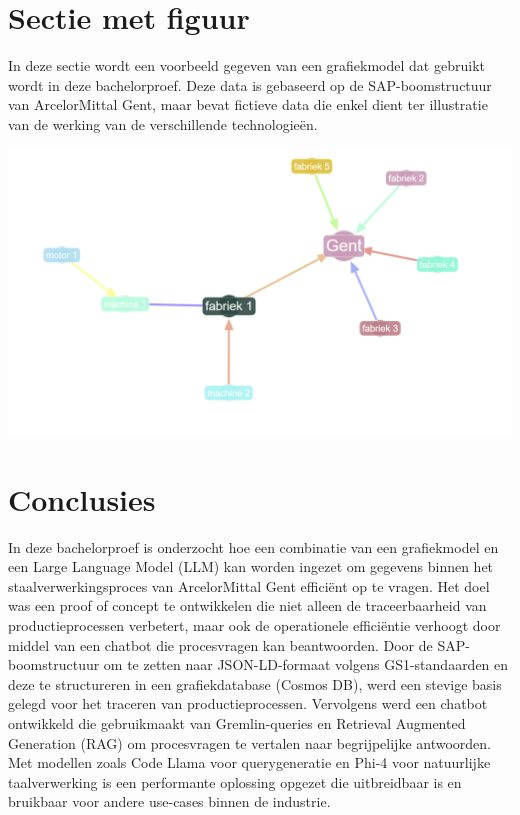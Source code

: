 \documentclass[a0,portrait]{hogent-poster}
\begin{document}
\begin{multicols}{2}
\section{Sectie met figuur}
In deze sectie wordt een voorbeeld gegeven van een grafiekmodel dat gebruikt wordt in deze bachelorproef.
Deze data is gebaseerd op de SAP-boomstructuur van ArcelorMittal Gent, maar bevat fictieve data die enkel dient ter illustratie van de werking van de verschillende technologieën.

\begin{center}
  \captionsetup{type=figure}
  \includegraphics[width=1.0\linewidth]{./img/grapmodel_example.png}
\end{center}

\section{Conclusies}
In deze bachelorproef is onderzocht hoe een combinatie van een grafiekmodel en een Large Language Model (LLM) kan worden ingezet om gegevens binnen het staalverwerkingsproces van ArcelorMittal Gent efficiënt op te vragen.
Het doel was een proof of concept te ontwikkelen die niet alleen de traceerbaarheid van productieprocessen verbetert, maar ook de operationele efficiëntie verhoogt door middel van een chatbot die procesvragen kan beantwoorden.
Door de SAP-boomstructuur om te zetten naar JSON-LD-formaat volgens GS1-standaarden en deze te structureren in een grafiekdatabase (Cosmos DB), werd een stevige basis gelegd voor het traceren van productieprocessen.
Vervolgens werd een chatbot ontwikkeld die gebruikmaakt van Gremlin-queries en Retrieval Augmented Generation (RAG) om procesvragen te vertalen naar begrijpelijke antwoorden.
Met modellen zoals Code Llama voor querygeneratie en Phi-4 voor natuurlijke taalverwerking is een performante oplossing opgezet die uitbreidbaar is en bruikbaar voor andere use-cases binnen de industrie.



\end{multicols}
\end{document}
